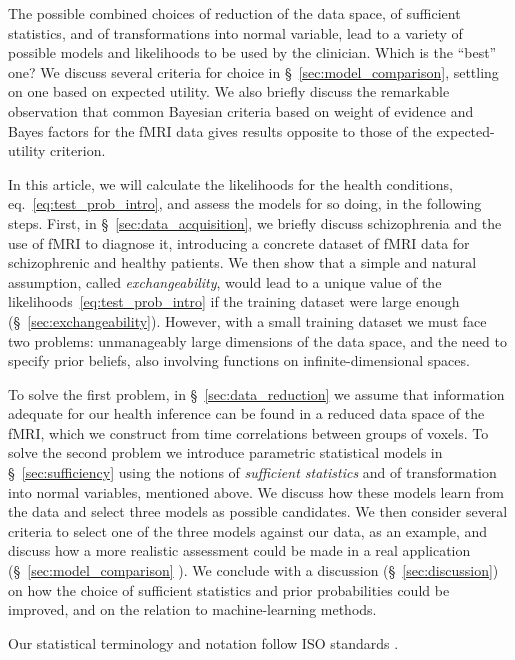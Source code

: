 \documentclass[%
]{frontiersSCNS-nologo} %
\newcommand*{\chaps}{chs} %
\newcommand*{\sect}{\S} %
\newcommand*{\eqn}{eq.}
\renewcommand*{\|}{\mathpunct{|}}%
\begin{document}
The possible combined choices of reduction of the data space, of sufficient
statistics, and of transformations into normal variable, lead to a variety
of possible models and likelihoods to be used by the clinician. Which is
the \enquote{best} one? We discuss several criteria for choice in
\sect~\ref{sec:model_comparison}, settling on one based on expected
utility. We also briefly discuss the remarkable observation that common Bayesian
criteria based on weight of evidence and Bayes factors
\citetext{\citealp[\chaps~V, VI, A]{jeffreys1939_r2003};
  \citealp{good1950,mackay1992,kassetal1995}} for the fMRI data gives
results opposite to those of the expected-utility criterion.

In this article, we will calculate the likelihoods for the health
conditions, \eqn~\eqref{eq:test_prob_intro}, and assess the models for so
doing, in the following steps. First, in \sect~\ref{sec:data_acquisition},
we briefly discuss schizophrenia and the use of fMRI to diagnose it,
introducing a concrete dataset of fMRI data for schizophrenic and healthy
patients. We then show that a simple and natural assumption, called
\emph{exchangeability}, would lead to a unique value of the
likelihoods~\eqref{eq:test_prob_intro} if the training dataset were large
enough (\sect~\ref{sec:exchangeability}). However, with a small training
dataset we must face two problems: unmanageably large dimensions of the
data space, and the need to specify prior beliefs, also involving functions
on infinite-dimensional spaces.
  
To solve the first problem, in \sect~\ref{sec:data_reduction} we assume
that information adequate for our health inference can be found in a
reduced data space of the fMRI, which we construct from time correlations
between groups of voxels. To solve the second problem we introduce
parametric statistical models in \sect~\ref{sec:sufficiency} using the
notions of \emph{sufficient statistics} and of transformation into normal
variables, mentioned above. We discuss how these models learn from the data
and select three models as possible candidates. We then consider several
criteria to select one of the three models against our data, as an example,
and discuss how a more realistic assessment could be made in a real
application (\sect~\ref{sec:model_comparison} ). We conclude with a
discussion (\sect~\ref{sec:discussion}) on how the choice of sufficient
statistics and prior probabilities could be improved, and on the relation to
machine-learning methods.

Our statistical terminology and notation follow ISO standards
\citep{iso1993_r2009,iso2006}.
\end{document}
